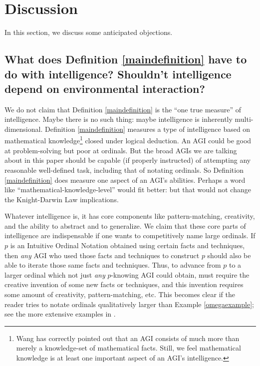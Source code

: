 \documentclass[runningheads]{llncs}
\begin{document}
\section{Discussion}
\label{objectionsection}

In this section, we discuss some anticipated objections.

\subsection{What does Definition \ref{maindefinition} have to do with intelligence?
Shouldn't intelligence depend on environmental interaction?}

We do not claim that Definition \ref{maindefinition} is the ``one true measure'' of
intelligence. Maybe there is no such thing: maybe intelligence is inherently
multi-dimensional. Definition \ref{maindefinition} measures a type of
intelligence based on mathematical knowledge\footnote{Wang has
correctly pointed out \cite{wang2007} that an AGI consists of much more than merely
a knowledge-set of mathematical facts. Still, we feel mathematical knowledge is at least
one important aspect of an AGI's intelligence.} closed under logical deduction. An
AGI could be good at problem-solving
but poor at ordinals. But the broad AGIs we are talking about in this paper
should be capable (if properly
instructed) of attempting any reasonable well-defined task, including that of
notating ordinals. So Definition \ref{maindefinition} does
measure one aspect of an AGI's abilities. Perhaps
a word like
``mathematical-knowledge-level'' would fit better: but
that would not change
the Knight-Darwin Law implications.

Whatever intelligence is, it has core components like pattern-matching,
creativity, and the ability to abstract and to generalize.
We claim that these core parts of intelligence are indispensable if one wants to
competitively name large ordinals. If $p$ is an Intuitive Ordinal Notation
obtained using certain facts and techniques, then \emph{any} AGI who used those
facts and techniques to construct $p$ should also be able to iterate those same
facts and techniques.
Thus, to advance from
$p$ to a larger ordinal which not just \emph{any} $p$-knowing
AGI could obtain, must require
the creative invention of some new facts or techniques, and
this invention requires some amount of creativity,
pattern-matching, etc. This becomes clear if the reader tries to
notate ordinals qualitatively larger than Example \ref{omegaexample};
see the more extensive examples in \cite{github}.
\end{document}
